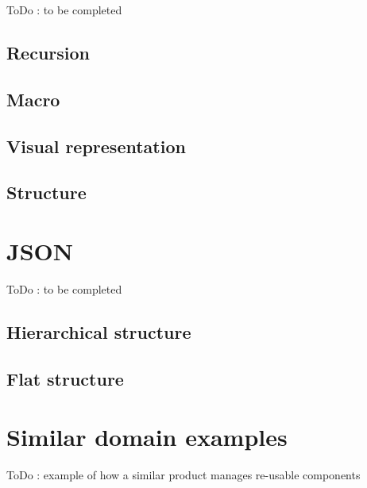 \documentclass[a4paper,11pt,final]{article}
\begin{document}
ToDo : to be completed
\subsection{Recursion}
\subsection{Macro}
\subsection{Visual representation}
\subsection{Structure}

\newpage
\section{JSON}
ToDo : to be completed
\subsection{Hierarchical structure}
\subsection{Flat structure}

\newpage
\section{Similar domain examples}
ToDo : example of how a similar product manages re-usable components

\newpage
\end{document}
